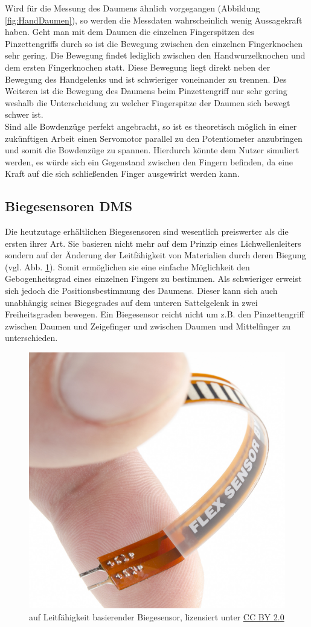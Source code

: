 \documentclass[a4paper,12pt,final]{article} %
\numberwithin{equation}{section} %
\numberwithin{figure}{section} %
\numberwithin{table}{section} %
\begin{document}
Wird für die Messung des Daumens ähnlich vorgegangen (Abbildung \ref{fig:HandDaumen}), so werden die Messdaten wahrscheinlich wenig Aussagekraft haben.
Geht man mit dem Daumen die einzelnen Fingerspitzen des Pinzettengriffs durch so ist die Bewegung zwischen den einzelnen Fingerknochen sehr gering. Die Bewegung findet lediglich zwischen den Hand\-wur\-zel\-knoch\-en und dem ersten Fingerknochen statt.
Diese Bewegung liegt direkt neben der Bewegung des Handgelenks und ist schwieriger voneinander zu trennen. Des Weiteren ist die Bewegung des Daumens beim Pinzettengriff nur sehr gering weshalb  die Unterscheidung zu welcher Fingerspitze der Daumen sich bewegt schwer ist.\\
Sind alle Bowdenzüge perfekt angebracht, so ist es theoretisch möglich in einer zukünftigen Arbeit einen Servomotor parallel zu den Potentiometer anzubringen und somit die Bowdenzüge zu spannen.
Hierdurch könnte dem Nutzer simuliert werden, es würde sich ein Gegenstand zwischen den Fingern befinden, da eine Kraft auf die sich schließenden Finger ausgewirkt werden kann.  
\subsection{Biegesensoren DMS}
Die heutzutage erhältlichen Biegesensoren sind wesentlich preiswerter als die ersten ihrer Art. Sie basieren nicht mehr auf dem Prinzip eines Lichwellenleiters sondern auf der Änderung der Leitfähigkeit von Materialien durch deren Biegung (vgl. Abb. \ref{fig:FlexSensor}). Somit ermöglichen sie eine einfache Möglichkeit den Gebogenheitsgrad eines einzelnen Fingers zu bestimmen. Als schwieriger erweist sich jedoch die Positionsbestimmung des Daumens. Dieser kann sich auch unabhängig seines Biegegrades auf dem unteren Sattelgelenk in zwei Freiheitsgraden bewegen. Ein Biegesensor reicht nicht um z.B. den Pinzettengriff zwischen Daumen und Zeigefinger und zwischen Daumen und Mittelfinger zu unterschieden.


\begin{figure}[ht]
	\begin{center}
		\includegraphics[width=0.3\linewidth]{Bilder/Flex_sensor.jpg}
		\caption{auf Leitfähigkeit basierender Biegesensor, lizensiert unter \href{https://creativecommons.org/licenses/by/2.0/}{CC BY 2.0}}
		\label{fig:FlexSensor}
	\end{center}
\end{figure}
\end{document}
